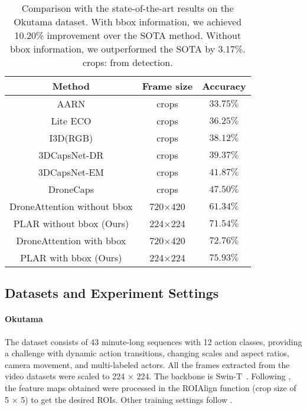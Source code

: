 \documentclass[letterpaper, 10 pt, conference]{ieeeconf}
\begin{document}
\begin{table}[t]
\centering
\begin{tabular}{c c c }
\toprule
Method & Frame size  & Accuracy    \\
\midrule
AARN \cite{yang2019framework, algamdi2020dronecaps} & crops  & $33.75\%$\\
Lite ECO \cite{zolfaghari2018eco, algamdi2020dronecaps} & crops  & $36.25\%$\\
I3D(RGB)\cite{carreira2017quo, algamdi2020dronecaps} &  crops & $38.12\%$\\
3DCapsNet-DR\cite{zhang2020capsnets, algamdi2020dronecaps} & crops  & $39.37\%$\\
3DCapsNet-EM\cite{zhang2020capsnets, algamdi2020dronecaps} & crops  & $41.87\%$\\
DroneCaps\cite{algamdi2020dronecaps} & crops  & $47.50\%$\\
DroneAttention without bbox\cite{yadav2023droneattention} & 720$\times$420 & $61.34\%$  \\
PLAR without bbox (Ours) & 224$\times$224 & $71.54\%$  \\
\midrule
DroneAttention with bbox \cite{yadav2023droneattention} & 720$\times$420& $72.76\%$  \\
PLAR with bbox (Ours) & 224$\times$224 & $75.93\%$  \\
\bottomrule
\end{tabular}
\caption{Comparison with the state-of-the-art results on the Okutama dataset. With bbox information, we achieved 10.20\% improvement over the SOTA method. Without bbox information, we outperformed the SOTA by 3.17\%. crops: from detection.}
\label{tab:okutama}
\end{table} \subsection{Datasets and Experiment Settings}
\paragraph{Okutama~\cite{barekatain2017okutama}} The dataset consists of 43 minute-long sequences with 12 action classes, providing a challenge with dynamic action transitions, changing scales and aspect ratios, camera movement, and multi-labeled actors. All the frames extracted from the video datasets were scaled to 224 × 224. The backbone is Swin-T~\cite{liu2021swin}. Following \cite{yadav2023droneattention}, the feature maps obtained were processed in the ROIAlign function (crop size of 5 × 5) to get the desired ROIs. Other training settings follow \cite{liu2021swin}.
\end{document}
